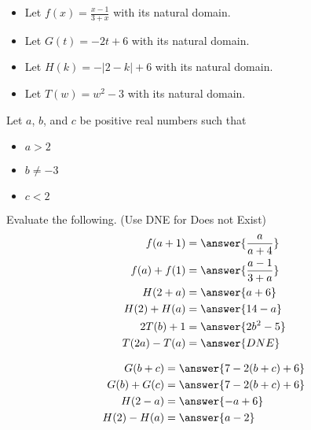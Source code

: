 \documentclass{ximera}
\author{Lee Wayand}
\begin{document}
\begin{exercise}



\begin{itemize}
\item Let $f(x) = \frac{x-1}{3 + x}$ with its natural domain. \\
\item Let $G(t) = -2t + 6$ with its natural domain. \\
\item Let $H(k) =  -|2-k|+6$ with its natural domain. \\
\item Let $T(w) = w^2 - 3$ with its natural domain. \\
\end{itemize}

Let $a$, $b$, and $c$ be positive real numbers such that 

\begin{itemize}
\item $a > 2$ 
\item $b \ne -3$
\item $c < 2$
\end{itemize}


Evaluate the following.  (Use DNE for Does not Exist) \\






\begin{align*}
f(a + 1)   &=  \answer{\frac{a}{a+4}} \\
f(a) + f(1)   &=  \answer{\frac{a-1}{3+a}} \\
H(2+a)    &=  \answer{a+6} \\
H(2) + H(a)    &=  \answer{14-a} \\
2 T(b) + 1   &=  \answer{2 b^2 - 5} \\
T(2a) - T(a)  &=  \answer{DNE}
\end{align*}






\begin{align*}
G(b+c)   &=  \answer{7-2(b+c)+6} \\
G(b) + G(c)   &=  \answer{7-2(b+c)+6} \\
H(2-a)    &=  \answer{-a+6} \\
H(2) - H(a)    &=  \answer{a-2} 
\end{align*}



\end{exercise}
\end{document}
